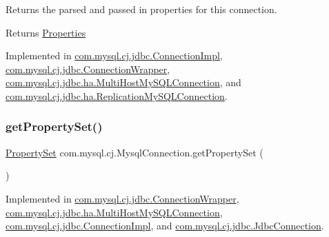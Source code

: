 Returns the parsed and passed in properties for this connection.

\begin{DoxyReturn}{Returns}
\mbox{\hyperlink{}{Properties}} 
\end{DoxyReturn}


Implemented in \mbox{\hyperlink{classcom_1_1mysql_1_1cj_1_1jdbc_1_1_connection_impl_a63bb38c4e47986e5b187fb3fefb9aec6}{com.\+mysql.\+cj.\+jdbc.\+Connection\+Impl}}, \mbox{\hyperlink{classcom_1_1mysql_1_1cj_1_1jdbc_1_1_connection_wrapper_a76eea5af4534baf71ff0852b0c0f6f9c}{com.\+mysql.\+cj.\+jdbc.\+Connection\+Wrapper}}, \mbox{\hyperlink{classcom_1_1mysql_1_1cj_1_1jdbc_1_1ha_1_1_multi_host_my_s_q_l_connection_a4a717cb95caa93ac7469d50383e2882b}{com.\+mysql.\+cj.\+jdbc.\+ha.\+Multi\+Host\+My\+S\+Q\+L\+Connection}}, and \mbox{\hyperlink{classcom_1_1mysql_1_1cj_1_1jdbc_1_1ha_1_1_replication_my_s_q_l_connection_a04a60b0695519e98a4827f90161f52da}{com.\+mysql.\+cj.\+jdbc.\+ha.\+Replication\+My\+S\+Q\+L\+Connection}}.

\mbox{\label{interfacecom_1_1mysql_1_1cj_1_1_mysql_connection_a51fb6a3db410136a80cda075db6a70f5}} 
\subsubsection{\texorpdfstring{get\+Property\+Set()}{getPropertySet()}}
{\footnotesize\ttfamily \mbox{\hyperlink{interfacecom_1_1mysql_1_1cj_1_1conf_1_1_property_set}{Property\+Set}} com.\+mysql.\+cj.\+Mysql\+Connection.\+get\+Property\+Set (\begin{DoxyParamCaption}{ }\end{DoxyParamCaption})}



Implemented in \mbox{\hyperlink{classcom_1_1mysql_1_1cj_1_1jdbc_1_1_connection_wrapper_a32dc1cdc24960317f3b65009ae5bb475}{com.\+mysql.\+cj.\+jdbc.\+Connection\+Wrapper}}, \mbox{\hyperlink{classcom_1_1mysql_1_1cj_1_1jdbc_1_1ha_1_1_multi_host_my_s_q_l_connection_adc1a5c59c115064dc892d458337dd638}{com.\+mysql.\+cj.\+jdbc.\+ha.\+Multi\+Host\+My\+S\+Q\+L\+Connection}}, \mbox{\hyperlink{classcom_1_1mysql_1_1cj_1_1jdbc_1_1_connection_impl_a46dbc5cd68d7e3bd2ba1931c4bd5f003}{com.\+mysql.\+cj.\+jdbc.\+Connection\+Impl}}, and \mbox{\hyperlink{interfacecom_1_1mysql_1_1cj_1_1jdbc_1_1_jdbc_connection_a8d7309165f9280946c8ac7a4fb8a22c7}{com.\+mysql.\+cj.\+jdbc.\+Jdbc\+Connection}}.

